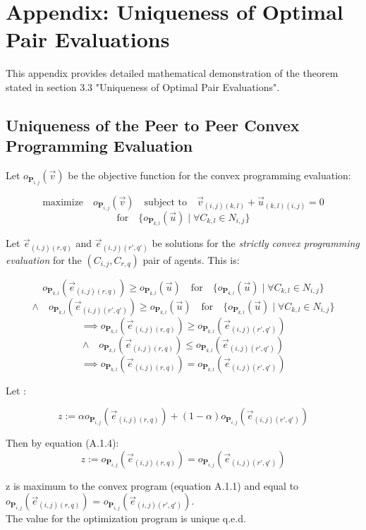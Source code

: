 \documentclass[12pt]{article}
\begin{document}
\newpage

\appendix
\section{Appendix: Uniqueness of Optimal Pair Evaluations}

This appendix provides detailed mathematical demonstration of the theorem stated in section 3.3 "Uniqueness of Optimal Pair Evaluations".

\subsection{Uniqueness of the Peer to Peer Convex Programming Evaluation}

Let \(o_{\mathbf{P}_{i,j}}(\vec{v})\) be the objective function for the convex programming evaluation:

\[
  \text{maximize} \quad o_{\mathbf{P}_{i,j}}(\vec{v}) \quad  \text{subject to}   \quad \vec{v}_{(i,j)(k,l)} + \vec{u}_{(k,l)(i,j)} = 0 \tag{A.1.1}
  \]
  \[
\text{for} \quad \{o_{\mathbf{P}_{k,l}}(\vec{u}) \mid \forall C_{k,l} \in N_{i,j}\} 
  \]
  
  Let \( \vec{e}_{(i,j) (r,q)} \) and \(\vec{e}_{(i,j) (r',q')}  \) be solutions for the \textit{strictly convex programming evaluation} for the  \( ( C_{i,j} , C_{r,q} )\) pair of agents. This is:

  \[
  o_{\mathbf{P}_{k,l}}(\vec{e}_{(i,j) (r,q)}) \geq o_{\mathbf{P}_{k,l}}(\vec{u}) \quad \text{for} \quad \{o_{\mathbf{P}_{k,l}}(\vec{u}) \mid \forall C_{k,l} \in N_{i,j}\} 
  \]  
    \[
  \land \quad o_{\mathbf{P}_{k,l}}(\vec{e}_{(i,j) (r',q')}) \geq o_{\mathbf{P}_{k,l}}(\vec{u}) \quad \text{for} \quad \{o_{\mathbf{P}_{k,l}}(\vec{u}) \mid \forall C_{k,l} \in N_{i,j}\} \tag{A.1.2}
  \]  
  \[
  \implies o_{\mathbf{P}_{k,l}}(\vec{e}_{(i,j) (r,q)}) \geq o_{\mathbf{P}_{k,l}}(\vec{e}_{(i,j) (r',q')})
  \]
    \[
  \land \quad o_{\mathbf{P}_{k,l}}(\vec{e}_{(i,j) (r,q)}) \leq o_{\mathbf{P}_{k,l}}(\vec{e}_{(i,j) (r',q')}) \tag{A.1.3}
  \]
    \[
  \implies o_{\mathbf{P}_{k,l}}(\vec{e}_{(i,j) (r,q)}) = o_{\mathbf{P}_{k,l}}(\vec{e}_{(i,j) (r',q')}) \tag{A.1.4}
  \]
  
  Let :
  
  \[ z := \alpha o_{\mathbf{P}_{i,j}}(\vec{e}_{(i,j) (r,q)}) + (1-\alpha)o_{\mathbf{P}_{i,j}}(\vec{e}_{(i,j) (r',q')}) \tag{A.1.5} \]
  
  Then by equation (A.1.4):
\[
z := o_{\mathbf{P}_{i,j}}(\vec{e}_{(i,j) (r,q)}) = o_{\mathbf{P}_{i,j}}(\vec{e}_{(i,j) (r',q')}) \tag{A.1.6}
\]

z is maximum to the convex program (equation A.1.1) and equal to \( o_{\mathbf{P}_{i,j}}(\vec{e}_{(i,j) (r,q)}) \) = \( o_{\mathbf{P}_{i,j}}(\vec{e}_{(i,j) (r',q')}) \). \\
The value for the optimization program is unique q.e.d.
\end{document}
